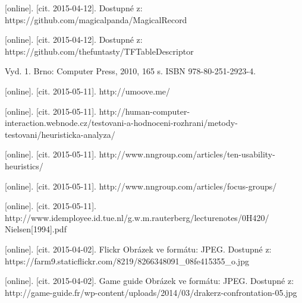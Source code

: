 \documentclass[twoside,12pt]{article}
\begin{document}
\begin{literatura}
{
	[online]. [cit. 2015-04-12]. Dostupné z: https://github.com/magicalpanda/MagicalRecord
}

{
	[online]. [cit. 2015-04-12]. Dostupné z: https://github.com/thefuntasty/TFTableDescriptor
}

{
	Vyd. 1. Brno: Computer Press, 2010, 165 s. ISBN 978-80-251-2923-4.
}

{
	[online]. [cit. 2015-05-11]. http://umoove.me/
}

{
	[online]. [cit. 2015-05-11]. http://human-computer-interaction.webnode.cz/testovani-a-hodnoceni-rozhrani/metody-testovani/heuristicka-analyza/
}

{
	[online]. [cit. 2015-05-11]. http://www.nngroup.com/articles/ten-usability-heuristics/
}

{
	[online]. [cit. 2015-05-11]. http://www.nngroup.com/articles/focus-groups/
}

{
	[online]. [cit. 2015-05-11]. http://www.idemployee.id.tue.nl/g.w.m.rauterberg/lecturenotes/0H420/ Nielsen[1994].pdf
}




{
	[online]. [cit. 2015-04-02]. Flickr
	Obrázek ve formátu: JPEG. Dostupné z: https://farm9.staticflickr.com/8219/8266348091\_08fe415355\_o.jpg
}

{
	[online]. [cit. 2015-04-02]. Game guide
	Obrázek ve formátu: JPEG. Dostupné z: http://game-guide.fr/wp-content/uploads/2014/03/drakerz-confrontation-05.jpg
}


\end{literatura}
\end{document}
